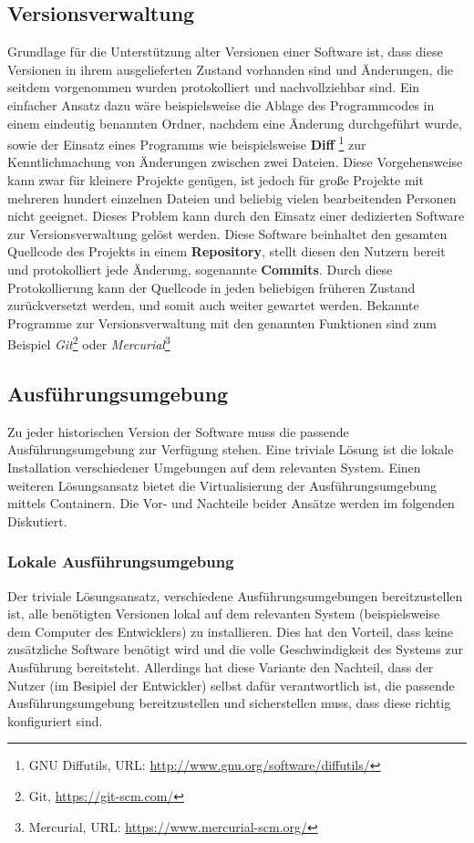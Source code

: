     \subsection{Versionsverwaltung}
        Grundlage für die Unterstützung alter Versionen einer Software ist, dass diese Versionen in ihrem ausgelieferten Zustand vorhanden sind und Änderungen, die seitdem
        vorgenommen wurden protokolliert und nachvollziehbar sind. Ein einfacher Ansatz dazu wäre beispielsweise die Ablage des Programmcodes in einem eindeutig benannten 
        Ordner, nachdem eine Änderung durchgeführt wurde, sowie der Einsatz eines Programms wie beispielsweise \textbf{Diff} \footnote{GNU Diffutils, URL: \url{http://www.gnu.org/software/diffutils/}} 
        zur Kenntlichmachung von Änderungen zwischen zwei Dateien. Diese Vorgehensweise kann zwar für kleinere Projekte genügen, ist jedoch für große Projekte mit mehreren 
        hundert einzelnen Dateien und beliebig vielen bearbeitenden Personen nicht geeignet. Dieses Problem kann durch den Einsatz einer dedizierten Software zur 
        Versionsverwaltung gelöst werden. Diese Software beinhaltet den gesamten Quellcode des Projekts in einem \textbf{Repository}, stellt diesen den Nutzern bereit 
        und protokolliert jede Änderung, sogenannte \textbf{Commits}. Durch diese Protokollierung kann der Quellcode in jeden beliebigen früheren Zustand zurückversetzt 
        werden, und somit auch weiter gewartet werden. Bekannte Programme zur Versionsverwaltung mit den genannten Funktionen sind zum Beispiel 
        \textit{Git}\footnote{Git, \url{https://git-scm.com/}} oder \textit{Mercurial}\footnote{Mercurial, URL: \url{https://www.mercurial-scm.org/}}
    \subsection{Ausführungsumgebung}
        Zu jeder historischen Version der Software muss die passende Ausführungsumgebung zur Verfügung stehen. Eine triviale 
        Lösung ist die lokale Installation verschiedener Umgebungen auf dem relevanten System. Einen weiteren Lösungsansatz 
        bietet die Virtualisierung der Ausführungsumgebung mittels Containern. Die Vor- und Nachteile beider Ansätze 
        werden im folgenden Diskutiert.
        \subsubsection{Lokale Ausführungsumgebung}
        Der triviale Lösungsansatz, verschiedene Ausführungsumgebungen bereitzustellen ist, alle benötigten Versionen lokal 
        auf dem relevanten System (beispielsweise dem Computer des Entwicklers) zu installieren. Dies hat den Vorteil, dass 
        keine zusätzliche Software benötigt wird und die volle Geschwindigkeit des Systems zur Ausführung bereitsteht. 
        Allerdings hat diese Variante den Nachteil, dass der Nutzer (im Besipiel der Entwickler) selbst dafür verantwortlich ist, 
        die passende Ausführungsumgebung bereitzustellen und sicherstellen muss, dass diese richtig konfiguriert sind. 
